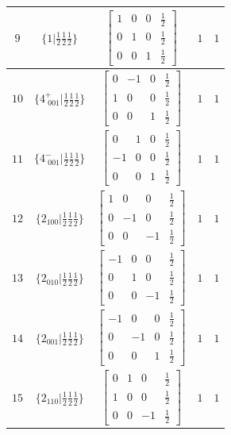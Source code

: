 \documentclass[fleqn,8pt]{jsarticle}
\begin{document}
\begin{longtable}{ccccc}
$ 9 $ & $ \{1|\frac{1}{2} \frac{1}{2} \frac{1}{2}\} $ & $ \begin{bmatrix} 1 & 0 & 0 & \frac{1}{2} \\ 0 & 1 & 0 & \frac{1}{2} \\ 0 & 0 & 1 & \frac{1}{2} \end{bmatrix} $ & $ 1 $ & $ 1 $ \\ \hline
$ 10 $ & $ \{4^{+}_{\,\,001}|\frac{1}{2} \frac{1}{2} \frac{1}{2}\} $ & $ \begin{bmatrix} 0 & -1 & 0 & \frac{1}{2} \\ 1 & 0 & 0 & \frac{1}{2} \\ 0 & 0 & 1 & \frac{1}{2} \end{bmatrix} $ & $ 1 $ & $ 1 $ \\ \hline
$ 11 $ & $ \{4^{-}_{\,\,001}|\frac{1}{2} \frac{1}{2} \frac{1}{2}\} $ & $ \begin{bmatrix} 0 & 1 & 0 & \frac{1}{2} \\ -1 & 0 & 0 & \frac{1}{2} \\ 0 & 0 & 1 & \frac{1}{2} \end{bmatrix} $ & $ 1 $ & $ 1 $ \\ \hline
$ 12 $ & $ \{2{}_{100}|\frac{1}{2} \frac{1}{2} \frac{1}{2}\} $ & $ \begin{bmatrix} 1 & 0 & 0 & \frac{1}{2} \\ 0 & -1 & 0 & \frac{1}{2} \\ 0 & 0 & -1 & \frac{1}{2} \end{bmatrix} $ & $ 1 $ & $ 1 $ \\ \hline
$ 13 $ & $ \{2{}_{010}|\frac{1}{2} \frac{1}{2} \frac{1}{2}\} $ & $ \begin{bmatrix} -1 & 0 & 0 & \frac{1}{2} \\ 0 & 1 & 0 & \frac{1}{2} \\ 0 & 0 & -1 & \frac{1}{2} \end{bmatrix} $ & $ 1 $ & $ 1 $ \\ \hline
$ 14 $ & $ \{2{}_{001}|\frac{1}{2} \frac{1}{2} \frac{1}{2}\} $ & $ \begin{bmatrix} -1 & 0 & 0 & \frac{1}{2} \\ 0 & -1 & 0 & \frac{1}{2} \\ 0 & 0 & 1 & \frac{1}{2} \end{bmatrix} $ & $ 1 $ & $ 1 $ \\ \hline
$ 15 $ & $ \{2{}_{110}|\frac{1}{2} \frac{1}{2} \frac{1}{2}\} $ & $ \begin{bmatrix} 0 & 1 & 0 & \frac{1}{2} \\ 1 & 0 & 0 & \frac{1}{2} \\ 0 & 0 & -1 & \frac{1}{2} \end{bmatrix} $ & $ 1 $ & $ 1 $ \\ \hline

\end{longtable}
\end{document}
